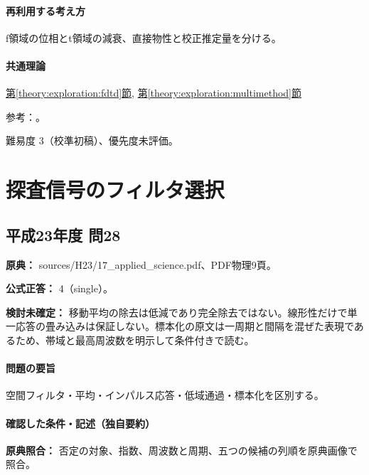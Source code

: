 \paragraph{再利用する考え方} f領域の位相とt領域の減衰、直接物性と校正推定量を分ける。

\paragraph{共通理論} \hyperref[theory:exploration:fdtd]{第\ref*{theory:exploration:fdtd}節}, \hyperref[theory:exploration:multimethod]{第\ref*{theory:exploration:multimethod}節}

\par 参考：\cite{epa_fdem,epa_tdem_archive,sato_lei2009_ae,gsi_gravity_definitions}。

\par 難易度 3（校準初稿）、優先度未評価。

\section{探査信号のフィルタ選択}

\subsection{平成23年度 問28}
\label{q:h23-reg-applied-28}

\noindent\textbf{原典：} sources/H23/17\_applied\_science.pdf、PDF物理9頁。

\textbf{公式正答：} 4（single）。

\par\textbf{検討未確定：} 移動平均の除去は低減であり完全除去ではない。線形性だけで単一応答の畳み込みは保証しない。標本化の原文は一周期と間隔を混ぜた表現であるため、帯域と最高周波数を明示して条件付きで読む。

\paragraph{問題の要旨} 空間フィルタ・平均・インパルス応答・低域通過・標本化を区別する。

\paragraph{確認した条件・記述（独自要約）}\mbox{}\par

\noindent\textbf{原典照合：} 否定の対象、指数、周波数と周期、五つの候補の列順を原典画像で照合。\par

